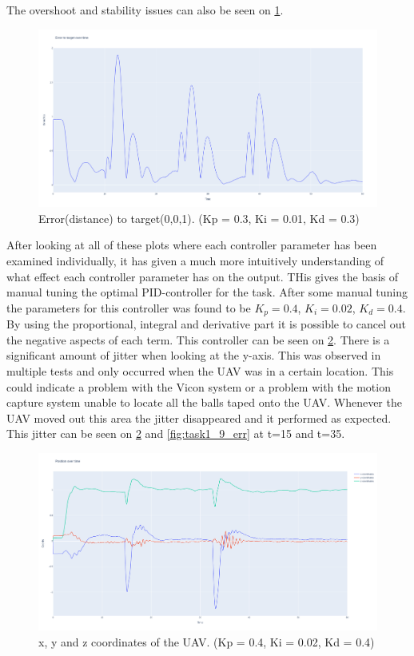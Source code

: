 \documentclass[conference]{IEEEtran}
\begin{document}
The overshoot and stability issues can also be seen on \cref{fig:task1_4_err}. 
\begin{figure}[hbtp]
	\centering
	\includegraphics[width=1.0\linewidth]{images/task1_4_err.png}
	\caption{Error(distance) to target(0,0,1). (Kp = 0.3, Ki = 0.01, Kd = 0.3)}
	\label{fig:task1_4_err}
\end{figure}

After looking at all of these plots where each controller parameter has been examined individually, it has given a much more intuitively understanding of what effect each controller parameter has on the output. THis gives the basis of manual tuning the optimal PID-controller for the task. After some manual tuning the parameters for this controller was found to be $K_p = 0.4$, $K_i = 0.02$, $K_d = 0.4$. By using the proportional, integral and derivative part it is possible to cancel out the negative aspects of each term. This controller can be seen on \cref{fig:task1_9_pos}. There is a significant amount of jitter when looking at the y-axis. This was observed in multiple tests and only occurred when the UAV was in a certain location. This could indicate a problem with the Vicon system or a problem with the motion capture system unable to locate all the balls taped onto the UAV. Whenever the UAV moved out this area the jitter disappeared and it performed as expected. This jitter can be seen on \cref{fig:task1_9_pos} and \cref{fig:task1_9_err} at t=15 and t=35.

\begin{figure}[hbtp]
	\centering
	\includegraphics[width=1.0\linewidth]{images/task1_9_pos.png}
	\caption{x, y and z coordinates of the UAV. (Kp = 0.4, Ki = 0.02, Kd = 0.4)}
	\label{fig:task1_9_pos}
\end{figure}
\end{document}
